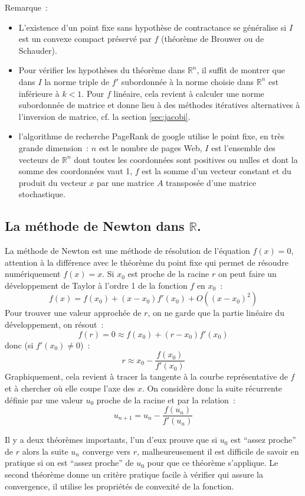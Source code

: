 \documentclass[a4paper,11pt]{article}
\begin{document}
\begin{giacjshere}
Remarque~: 
\begin{itemize}
\item L'existence d'un point fixe sans hypoth\`ese de contractance
se g\'en\'eralise si $I$ est un convexe compact pr\'eserv\'e
par $f$ (th\'eor\`eme
de Brouwer ou de Schauder).
\item Pour v\'erifier les hypoth\`eses du th\'eor\`eme dans
$\mathbb{R}^n$, il suffit de montrer que dans $I$ la norme triple de $f'$
subordonn\'ee \`a la norme choisie dans $\mathbb{R}^n$ est inf\'erieure
\`a $k<1$. Pour $f$ lin\'eaire,
cela revient \`a calculer une norme subordonn\'ee de matrice
et donne lieu \`a des m\'ethodes it\'eratives alternatives \`a
l'inversion de matrice, cf. la section \ref{sec:jacobi}.
\item l'algorithme de recherche
PageRank de google utilise le point fixe, en tr\`es grande dimension~:
$n$ est le nombre de pages Web, $I$ est l'ensemble des vecteurs
de $\mathbb{R}^n$ dont toutes les coordonn\'ees sont positives ou nulles et
dont la somme des coordonn\'ees vaut 1, $f$ est la somme d'un vecteur
constant et du produit du vecteur $x$ par une matrice $A$ transpos\'ee
d'une matrice stochastique.
\end{itemize}

\subsection{La méthode de Newton dans $\mathbb{R}$.}
La méthode de Newton est une méthode de résolution de l'équation
$f(x)=0$, attention à la différence avec le théorème du point fixe
qui permet de résoudre numériquement $f(x)=x$.
Si $x_0$ est proche de la racine $r$
on peut faire un développement de Taylor à l'ordre 1 de la
fonction $f$ en $x_0$~:
\[ f(x)=f(x_0)+(x-x_0)f'(x_0)+O((x-x_0)^2) \]
Pour trouver une valeur approchée de $r$, on ne garde que la partie
linéaire du développement, on résout~:
\[ f(r)=0 \approx f(x_0) + (r-x_0) f'(x_0) \]
donc (si $f'(x_0)\neq 0$)~:
\[ r \approx x_0 -\frac{f(x_0)}{f'(x_0)}\]
Graphiquement, cela revient à tracer la tangente à la courbe représentative
de $f$ et à chercher où elle coupe l'axe des $x$.
On considère donc la suite récurrente définie par une valeur $u_0$
proche de la racine et par la relation~:
\[ u_{n+1} = u_n -\frac{f(u_n)}{f'(u_n)}\]

Il y a deux théorèmes importants, l'un d'eux prouve que
si $u_0$ est ``assez proche'' de $r$ alors la suite $u_n$ converge vers $r$,
malheureusement il est difficile de savoir en pratique si on est 
``assez proche'' de $u_0$ pour que ce théorème s'applique. Le second
théorème donne un critère pratique facile à vérifier qui assure
la convergence, il utilise les propriétés de convexité de la fonction.


\end{giacjshere}
\end{document}
